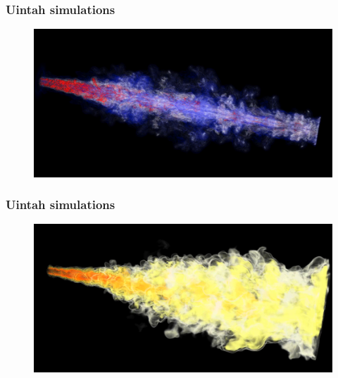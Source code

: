 \documentclass{beamer}
\begin{document}
\begin{frame}[fragile]
 \frametitle{Uintah simulations}
 \begin{figure}
  \centering
  \includegraphics[width=\textwidth]{uintah2.png}
 \end{figure}
\end{frame}

\begin{frame}[fragile]
 \frametitle{Uintah simulations}
 \begin{figure}
  \centering
  \includegraphics[width=\textwidth]{uintah3.png}
 \end{figure}
\end{frame}
\end{document}
